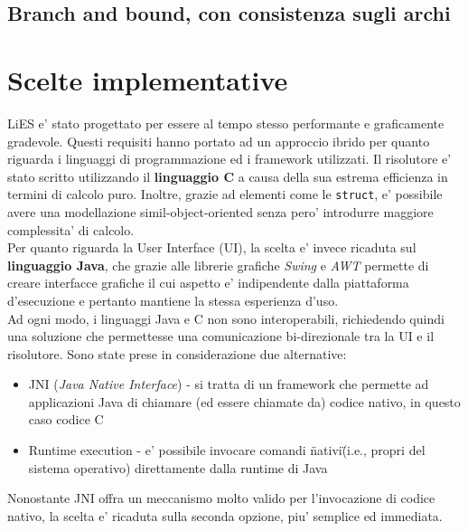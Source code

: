 \documentclass{article}
\begin{document}
\subsection{Branch and bound, con consistenza sugli archi}
\label{sec:branch_and_bound_ac}


\section{Scelte implementative}
\label{sec:scelte_implementative}

LiES e' stato progettato per essere al tempo stesso performante e graficamente gradevole. Questi requisiti hanno portato ad un approccio ibrido per quanto riguarda i linguaggi di programmazione ed i framework utilizzati. Il risolutore e' stato scritto utilizzando il \textbf{linguaggio C} a causa della sua estrema efficienza in termini di calcolo puro. Inoltre, grazie ad elementi come le \verb+struct+, e' possibile avere una modellazione simil-object-oriented senza pero' introdurre maggiore complessita' di calcolo.\\

Per quanto riguarda la User Interface (UI), la scelta e' invece ricaduta sul \textbf{linguaggio Java}, che grazie alle librerie grafiche \textit{Swing} e \textit{AWT} permette di creare interfacce grafiche il cui aspetto e' indipendente dalla piattaforma d'esecuzione e pertanto mantiene la stessa esperienza d'uso.\\

Ad ogni modo, i linguaggi Java e C non sono interoperabili, richiedendo quindi una soluzione che permettesse una comunicazione bi-direzionale tra la UI e il risolutore. Sono state prese in considerazione due alternative:
\begin{itemize}
	\item JNI (\textit{Java Native Interface}) - si tratta di un framework che permette ad applicazioni Java di chiamare (ed essere chiamate da) codice nativo, in questo caso codice C
	\item Runtime execution - e' possibile invocare comandi \"nativi\" (i.e., propri del sistema operativo) direttamente dalla runtime di Java
\end{itemize}

Nonostante JNI offra un meccanismo molto valido per l'invocazione di codice nativo, la scelta e' ricaduta sulla seconda opzione, piu' semplice ed immediata.
\end{document}
